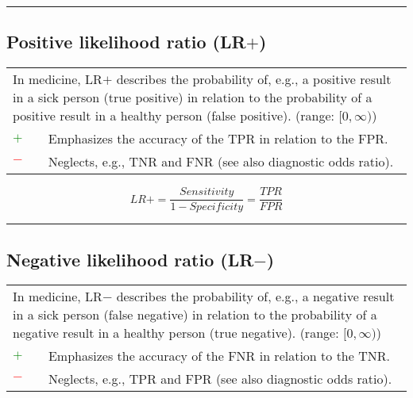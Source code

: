 \documentclass{article}
\begin{document}
\hrule


\subsection[Positive likelihood ratio (LR+)]{Positive likelihood ratio (LR$+$) \cite{swets1973relative, deeks2004diagnostic}}

\begin{table}[H]\centering
	\begin{tabular}{m{}m{}}
		\multicolumn{2}{m{0.95\textwidth}}{In medicine, LR$+$ describes the probability of, e.g., a positive result in a sick person (true positive) in relation to the probability of a positive result in a healthy person (false positive). (range: $[0, \infty)$)} \\
		\textcolor{Green}{$+$} & Emphasizes the accuracy of the TPR in relation to the FPR. \\
		\textcolor{Red}{$-$}   & Neglects, e.g., TNR and FNR (see also diagnostic odds ratio).
	\end{tabular}
\end{table}

\begin{equation}
	\textit{LR}+ = \dfrac{\textit{Sensitivity}}{1 - \textit{Specificity}} = \dfrac{\textit{TPR}}{\textit{FPR}}
%
	\label{equation:LR+}
\end{equation}

\hrule


\subsection[Negative likelihood ratio (LR-)]{Negative likelihood ratio (LR$-$) \cite{swets1973relative, deeks2004diagnostic}}

\begin{table}[H]\centering
	\begin{tabular}{m{}m{}}
		\multicolumn{2}{m{0.95\textwidth}}{In medicine, LR$-$ describes the probability of, e.g., a negative result in a sick person (false negative) in relation to the probability of a negative result in a healthy person (true negative). (range: $[0, \infty)$)} \\
		\textcolor{Green}{$+$} & Emphasizes the accuracy of the FNR in relation to the TNR. \\
		\textcolor{Red}{$-$}   & Neglects, e.g., TPR and FPR (see also diagnostic odds ratio).
	\end{tabular}
\end{table}
\end{document}
